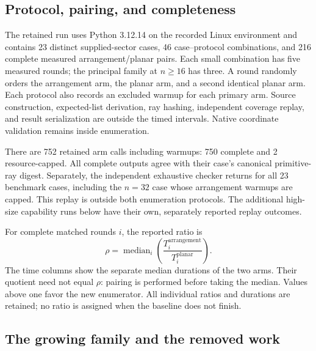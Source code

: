 \subsection{Protocol, pairing, and completeness}

The retained run uses Python 3.12.14 on the recorded Linux
environment and contains 23 distinct supplied-sector cases,
46 case--protocol combinations, and 216 complete measured
arrangement/planar pairs. Each small combination has five measured
rounds; the principal family at $n\ge16$ has three. A round randomly
orders the arrangement arm, the planar arm, and a second identical
planar arm. Each protocol also records an excluded warmup for each
primary arm. Source construction, expected-list derivation, ray hashing,
independent coverage replay, and result serialization are outside the
timed intervals. Native coordinate validation remains inside enumeration.

There are 752 retained arm calls including warmups: 750 complete
and 2 resource-capped. All complete outputs agree with their case's
canonical primitive-ray digest. Separately, the independent exhaustive
checker returns  for all 23 benchmark cases, including
the $n=32$ case whose arrangement warmups are capped. This replay is
outside both enumeration protocols. The additional high-size capability
runs below have their own, separately reported replay outcomes.

For complete matched rounds $i$, the reported ratio is
\[
 \rho=\operatorname{median}_i
       \left(\frac{T_i^{\mathrm{arrangement}}}{T_i^{\mathrm{planar}}}\right).
\]
The time columns show the separate median durations of the two arms.
Their quotient need not equal $\rho$: pairing is performed before
taking the median. Values above one favor the new enumerator. All
individual ratios and durations are retained; no ratio is assigned
when the baseline does not finish.

\subsection{The growing family and the removed work}

